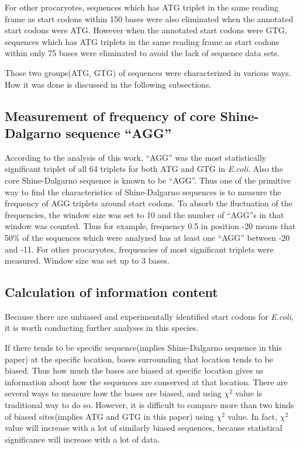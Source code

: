 For other procaryotes, sequences which has ATG triplet in the same
reading frame as start codons within 150 bases were also eliminated
when the annotated start codons were ATG. However when the annotated
start codons were GTG, sequences which has ATG triplets in the same
reading frame as start codons within only 75 bases were eliminated to
avoid the lack of sequence data sets.

Those two groups(ATG, GTG) of sequences were characterized in
various ways. How it was done is discussed in the following subsections.

\subsection{Measurement of frequency of core Shine-Dalgarno sequence ``AGG''}

According to the analysis of this work, ``AGG'' was the most
statistically significant triplet of all 64 triplets for both ATG and
GTG in {\it E.coli}. Also the core Shine-Dalgarno sequence is known to
be ``AGG''\cite{arclabel5}.  Thus one of the primitive way to find the
characteristics of Shine-Dalgarno sequences is to measure the frequency
of AGG triplets around start codons. To absorb the fluctuation of the
frequencies, the window size was set to 10 and the number of ``AGG''s in
that window was counted. Thus for example, frequency 0.5 in position -20
means that 50\% of the sequences which were analyzed has at least one
``AGG'' between -20 and -11. For other procaryotes, frequencies of most
significant triplets were measured. Window size was set up to 3 bases.


\subsection{Calculation of information content}

Because there are unbiased and experimentally identified start
codons for {\it E.coli}, it is worth conducting further analyses in this 
species.

If there tends to be specific sequence(implies Shine-Dalgarno sequence
in this paper) at the specific location, bases surrounding that
location tends to be biased. Thus how much the bases are biased at
specific location gives us information about how the sequences are
conserved at that location. There are several ways to measure how the
bases are biased, and using \(\chi^{2}\) value is traditional way to
do so.  However, it is difficult to compare more than two kinds of
biased sites(implies ATG and GTG in this paper) using \(\chi^{2}\)
value. In fact, \(\chi^{2}\) value will increase with a lot of
similarly biased sequences, because statistical significance will
increase with a lot of data.

